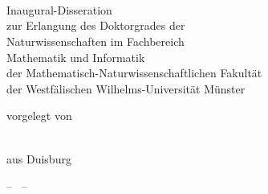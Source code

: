 
\begin{titlepage}

\begin{addmargin}[-1cm]{-3cm}
\begin{center}
\large

\hfill
\vfill

{\LARGE {}}



\vfill

\begingroup
  \huge \color{\titleColor}
  \begin{spacing}{1.25}
    \\
    \\
     \\
  \end{spacing}
\endgroup

\vfill

\begin{center}
  \begin{minipage}[t]{.85\textwidth}
    \centering
    \begin{spacing}{1.2}
    Inaugural-Disseration\\ zur Erlangung des Doktorgrades der\\
    Naturwissenschaften im Fachbereich\\ Mathematik und Informatik\\ der
    Mathematisch-Naturwissenschaftlichen Fakultät\\ der Westfälischen
    Wilhelms-Universität Münster
    \end{spacing}
  \end{minipage}
\end{center}

\vfill

vorgelegt von

\bigskip \bigskip

\spacedlowsmallcaps{\myName} \\ \medskip
aus Duisburg

\bigskip \bigskip

-- \myTime\ --

\vfill

\end{center}
\end{addmargin}

\end{titlepage}

